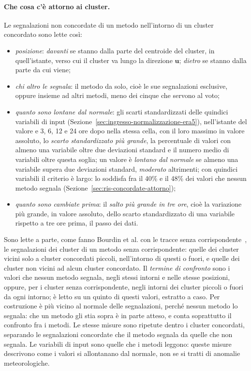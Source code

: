 \paragraph{Che cosa c'è attorno ai cluster.} Le segnalazioni non concordate di un metodo nell'intorno di un cluster concordato sono lette così:
\begin{itemize}
    \item \emph{posizione}: \emph{davanti} se stanno dalla parte del centroide del cluster, in quell'istante, verso cui il cluster va lungo la direzione $\mathbf{u}$; \emph{dietro} se stanno dalla parte da cui viene;
    \item \emph{chi altro le segnala}: il metodo da solo, cioè le sue segnalazioni esclusive, oppure insieme ad altri metodi, meno dei cinque che servono al voto;
    \item \emph{quanto sono lontane dal normale}: gli scarti standardizzati delle quindici variabili di input (Sezione~\ref{sec:ingresso-normalizzazione-era5}), nell'istante del valore e 3, 6, 12 e 24 ore dopo nella stessa cella, con il loro massimo in valore assoluto, lo \emph{scarto standardizzato più grande}, la percentuale di valori con almeno una variabile oltre due deviazioni standard e il numero medio di variabili oltre questa soglia; un valore è \emph{lontano dal normale} se almeno una variabile supera due deviazioni standard, \emph{moderato} altrimenti; con quindici variabili il criterio è largo: lo soddisfa fra il 40\% e il 48\% dei valori che nessun metodo segnala (Sezione~\ref{sec:ris-concordate-attorno});
    \item \emph{quanto sono cambiate prima}: il \emph{salto più grande in tre ore}, cioè la variazione più grande, in valore assoluto, dello scarto standardizzato di una variabile rispetto a tre ore prima, il passo dei dati.
\end{itemize}
Sono lette a parte, come fanno Bourdin et al. con le tracce senza corrispondente~\cite{bourdin2022tc}, le segnalazioni dei cluster di un metodo senza corrispondente: quelle dei cluster vicini solo a cluster concordati piccoli, nell'intorno di questi o fuori, e quelle dei cluster non vicini ad alcun cluster concordato. Il \emph{termine di confronto} sono i valori che nessun metodo segnala, negli stessi intorni e nelle stesse posizioni, oppure, per i cluster senza corrispondente, negli intorni dei cluster piccoli o fuori da ogni intorno; è letto su un quinto di questi valori, estratto a caso. Per costruzione è più vicino al normale delle segnalazioni, perché nessun metodo lo segnala: che un metodo gli stia sopra è in parte atteso, e conta soprattutto il confronto fra i metodi. Le stesse misure sono ripetute dentro i cluster concordati, separando le segnalazioni concordate che il metodo segnala da quelle che non segnala. Le variabili di input sono quelle che i metodi leggono: queste misure descrivono come i valori si allontanano dal normale, non se si tratti di anomalie meteorologiche.

